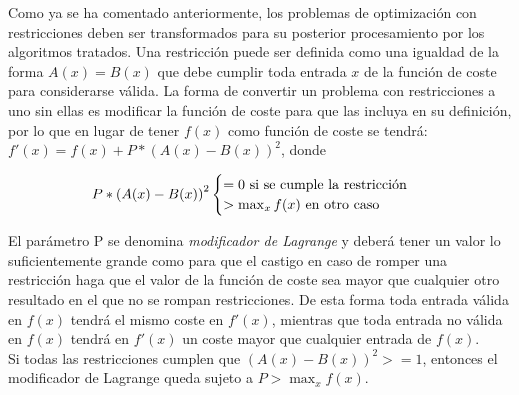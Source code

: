 Como ya se ha comentado anteriormente, los problemas de optimización con restricciones deben ser transformados para su posterior procesamiento por los algoritmos tratados.
Una restricción puede ser definida como una igualdad de la forma $A(x) = B(x)$ que debe cumplir toda entrada $x$ de la función de coste para considerarse válida.
La forma de convertir un problema con restricciones a uno sin ellas es modificar la función de coste para que las incluya en su definición, por lo que en lugar de tener $f(x)$ como función de coste se tendrá:
$f'(x) = f(x) + P*{(A(x) - B(x))}^2$, donde

\begin{align}
  P*{(A(x) - B(x))}^2 \begin{cases}
    = 0 \textnormal{ si se cumple la restricción } \\
    > \max_x{f(x)} \textnormal{ en otro caso }
  \end{cases}
\end{align}

El parámetro P se denomina \textit{modificador de Lagrange} y deberá tener un valor lo suficientemente grande como para que el castigo en caso de romper una restricción haga que el valor de la función de coste sea mayor que cualquier otro resultado en el que no se rompan restricciones.
De esta forma toda entrada válida en $f(x)$ tendrá el mismo coste en $f'(x)$, mientras que toda entrada no válida en $f(x)$ tendrá en $f'(x)$ un coste mayor que cualquier entrada de $f(x)$.
\\
Si todas las restricciones cumplen que ${(A(x) - B(x))}^2 >= 1$, entonces el modificador de Lagrange queda sujeto a $P > \max_x{f(x)}$.


